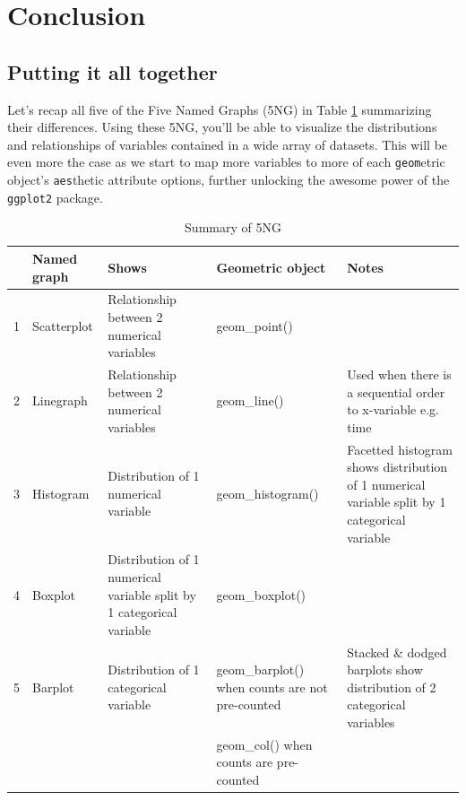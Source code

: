 \documentclass[12pt,]{krantz}
\theoremstyle{definition}
\theoremstyle{definition}
\theoremstyle{definition}
\theoremstyle{remark}
\begin{document}
\section{Conclusion}\label{conclusion-1}

\subsection{Putting it all together}\label{putting-it-all-together}

Let's recap all five of the Five Named Graphs (5NG) in Table
\ref{tab:viz-summary-table} summarizing their differences. Using these
5NG, you'll be able to visualize the distributions and relationships of
variables contained in a wide array of datasets. This will be even more
the case as we start to map more variables to more of each
\texttt{geom}etric object's \texttt{aes}thetic attribute options,
further unlocking the awesome power of the \texttt{ggplot2} package.

\begin{table}[H]

\caption{\label{tab:viz-summary-table}Summary of 5NG}
\centering
\fontsize{10}{12}\selectfont
\begin{tabular}[t]{rl>{\raggedright\arraybackslash}p{0.75in}>{\raggedright\arraybackslash}p{1.1in}>{\raggedright\arraybackslash}p{1.1in}}
\toprule
  & Named graph & Shows & Geometric object & Notes\\
\midrule
1 & Scatterplot & Relationship between 2 numerical variables & geom\_point() & \\
2 & Linegraph & Relationship between 2 numerical variables & geom\_line() & Used when there is a sequential order to x-variable e.g. time\\
3 & Histogram & Distribution of 1 numerical variable & geom\_histogram() & Facetted histogram shows distribution of 1 numerical variable split by 1 categorical variable\\
4 & Boxplot & Distribution of 1 numerical variable split by 1 categorical variable & geom\_boxplot() & \\
5 & Barplot & Distribution of 1 categorical variable & geom\_barplot() when counts are not pre-counted & Stacked \& dodged barplots show distribution of 2 categorical variables\\
 &  &  & geom\_col() when counts are pre-counted & \\
\bottomrule
\end{tabular}
\end{table}
\end{document}
